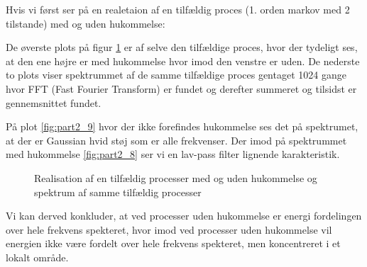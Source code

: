 Hvis vi først ser på en realetaion af en tilfældig proces (1. orden markov med 2 tilstande) med og uden hukommelse:

De øverste plots på figur \ref{fig:part2_markov} er af selve den tilfældige proces, hvor der tydeligt ses, at den ene højre er med hukommelse hvor imod den venstre er uden. De nederste to plots viser spektrummet af de samme tilfældige proces gentaget 1024 gange hvor FFT (Fast Fourier Transform) er fundet og derefter summeret og tilsidst er gennemsnittet fundet.

 På plot \ref{fig:part2_9} hvor der ikke forefindes hukommelse ses det på spektrumet, at der er Gaussian hvid støj som er alle frekvenser. Der imod på spektrummet med hukommelse \ref{fig:part2_8}  ser vi en lav-pass filter lignende karakteristik.  
 \begin{figure}[!h]
	\centering
	\caption{Realisation af en tilfældig processer med og uden hukommelse og spektrum af samme tilfældig processer  }
	\label{fig:part2_markov}
\end{figure}
\newpage
Vi kan derved konkluder, at ved processer uden hukommelse er energi fordelingen over hele frekvens spekteret, hvor imod ved processer uden hukommelse vil energien ikke være fordelt over hele frekvens spekteret, men koncentreret i et lokalt område. 


